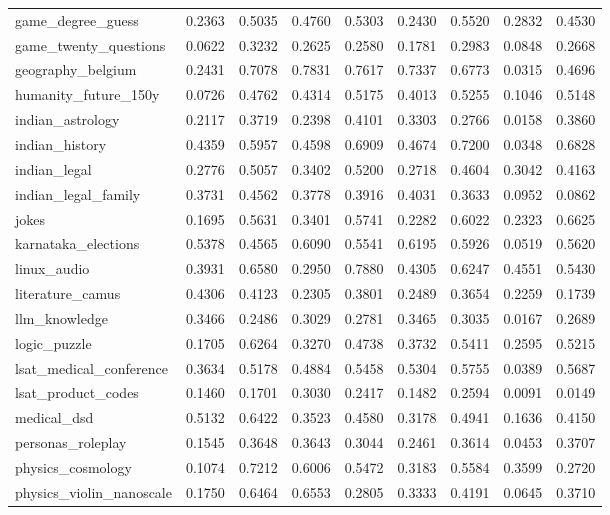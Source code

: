 \documentclass[pdflatex,sn-mathphys-num]{sn-jnl}%
\theoremstyle{thmstyleone}%
\theoremstyle{thmstyletwo}%
\theoremstyle{thmstylethree}%
\begin{document}
\begin{appendices}
\begin{landscape}
\begin{longtable}{@{}p{3.8cm}cccccccc@{}}
game\_degree\_guess & 0.2363 & 0.5035 & 0.4760 & 0.5303 & 0.2430 & 0.5520 & 0.2832 & 0.4530 \\
game\_twenty\_questions & 0.0622 & 0.3232 & 0.2625 & 0.2580 & 0.1781 & 0.2983 & 0.0848 & 0.2668 \\
geography\_belgium & 0.2431 & 0.7078 & 0.7831 & 0.7617 & 0.7337 & 0.6773 & 0.0315 & 0.4696 \\
humanity\_future\_150y & 0.0726 & 0.4762 & 0.4314 & 0.5175 & 0.4013 & 0.5255 & 0.1046 & 0.5148 \\
indian\_astrology & 0.2117 & 0.3719 & 0.2398 & 0.4101 & 0.3303 & 0.2766 & 0.0158 & 0.3860 \\
indian\_history & 0.4359 & 0.5957 & 0.4598 & 0.6909 & 0.4674 & 0.7200 & 0.0348 & 0.6828 \\
indian\_legal & 0.2776 & 0.5057 & 0.3402 & 0.5200 & 0.2718 & 0.4604 & 0.3042 & 0.4163 \\
indian\_legal\_family & 0.3731 & 0.4562 & 0.3778 & 0.3916 & 0.4031 & 0.3633 & 0.0952 & 0.0862 \\
jokes & 0.1695 & 0.5631 & 0.3401 & 0.5741 & 0.2282 & 0.6022 & 0.2323 & 0.6625 \\
karnataka\_elections & 0.5378 & 0.4565 & 0.6090 & 0.5541 & 0.6195 & 0.5926 & 0.0519 & 0.5620 \\
linux\_audio & 0.3931 & 0.6580 & 0.2950 & 0.7880 & 0.4305 & 0.6247 & 0.4551 & 0.5430 \\
literature\_camus & 0.4306 & 0.4123 & 0.2305 & 0.3801 & 0.2489 & 0.3654 & 0.2259 & 0.1739 \\
llm\_knowledge & 0.3466 & 0.2486 & 0.3029 & 0.2781 & 0.3465 & 0.3035 & 0.0167 & 0.2689 \\
logic\_puzzle & 0.1705 & 0.6264 & 0.3270 & 0.4738 & 0.3732 & 0.5411 & 0.2595 & 0.5215 \\
lsat\_medical\_conference & 0.3634 & 0.5178 & 0.4884 & 0.5458 & 0.5304 & 0.5755 & 0.0389 & 0.5687 \\
lsat\_product\_codes & 0.1460 & 0.1701 & 0.3030 & 0.2417 & 0.1482 & 0.2594 & 0.0091 & 0.0149 \\
medical\_dsd & 0.5132 & 0.6422 & 0.3523 & 0.4580 & 0.3178 & 0.4941 & 0.1636 & 0.4150 \\
personas\_roleplay & 0.1545 & 0.3648 & 0.3643 & 0.3044 & 0.2461 & 0.3614 & 0.0453 & 0.3707 \\
physics\_cosmology & 0.1074 & 0.7212 & 0.6006 & 0.5472 & 0.3183 & 0.5584 & 0.3599 & 0.2720 \\
physics\_violin\_nanoscale & 0.1750 & 0.6464 & 0.6553 & 0.2805 & 0.3333 & 0.4191 & 0.0645 & 0.3710 \\

\end{longtable}
\end{landscape}
\end{appendices}
\end{document}
